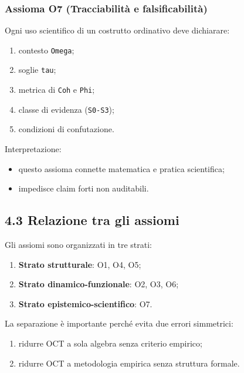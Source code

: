 \subsubsection{Assioma O7 (Tracciabilità e falsificabilità)}

Ogni uso scientifico di un costrutto ordinativo deve dichiarare:

\begin{enumerate}
\def\labelenumi{\arabic{enumi}.}
\tightlist
\item
  contesto \texttt{Omega};
\item
  soglie \texttt{tau};
\item
  metrica di \texttt{Coh} e \texttt{Phi};
\item
  classe di evidenza (\texttt{S0-S3});
\item
  condizioni di confutazione.
\end{enumerate}

Interpretazione:

\begin{itemize}
\tightlist
\item
  questo assioma connette matematica e pratica scientifica;
\item
  impedisce claim forti non auditabili.
\end{itemize}

\subsection{4.3 Relazione tra gli assiomi}

Gli assiomi sono organizzati in tre strati:

\begin{enumerate}
\def\labelenumi{\arabic{enumi}.}
\tightlist
\item
  \textbf{Strato strutturale}: O1, O4, O5;
\item
  \textbf{Strato dinamico-funzionale}: O2, O3, O6;
\item
  \textbf{Strato epistemico-scientifico}: O7.
\end{enumerate}

La separazione è importante perché evita due errori simmetrici:

\begin{enumerate}
\def\labelenumi{\arabic{enumi}.}
\tightlist
\item
  ridurre OCT a sola algebra senza criterio empirico;
\item
  ridurre OCT a metodologia empirica senza struttura formale.
\end{enumerate}

